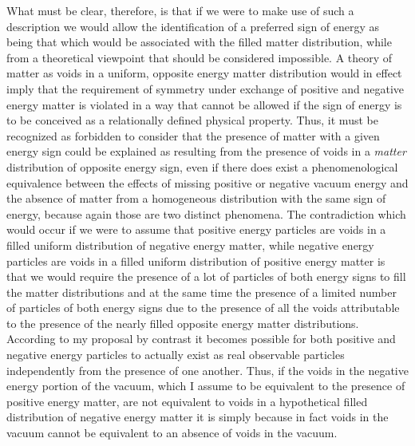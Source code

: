 \documentclass[notitlepage,12pt]{report}
\begin{document}
What must be clear, therefore, is that if we were to make use of such a description we would allow the identification of a preferred sign of energy as being that which would be associated with the filled matter distribution, while from a theoretical viewpoint that should be considered impossible. A theory of matter as voids in a uniform, opposite energy matter distribution would in effect imply that the requirement of symmetry under exchange of positive and negative energy matter is violated in a way that cannot be allowed if the sign of energy is to be conceived as a relationally defined physical property. Thus, it must be recognized as forbidden to consider that the presence of matter with a given energy sign could be explained as resulting from the presence of voids in a \textit{matter} distribution of opposite energy sign, even if there does exist a phenomenological equivalence between the effects of missing positive or negative vacuum energy and the absence of matter from a homogeneous distribution with the same sign of energy, because again those are two distinct phenomena. The contradiction which would occur if we were to assume that positive energy particles are voids in a filled uniform distribution of negative energy matter, while negative energy particles are voids in a filled uniform distribution of positive energy matter is that we would require the presence of a lot of particles of both energy signs to fill the matter distributions and at the same time the presence of a limited number of particles of both energy signs due to the presence of all the voids attributable to the presence of the nearly filled opposite energy matter distributions. According to my proposal by contrast it becomes possible for both positive and negative energy particles to actually exist as real observable particles independently from the presence of one another. Thus, if the voids in the negative energy portion of the vacuum, which I assume to be equivalent to the presence of positive energy matter, are not equivalent to voids in a hypothetical filled distribution of negative energy matter it is simply because in fact voids in the vacuum cannot be equivalent to an absence of voids in the vacuum.
\end{document}
